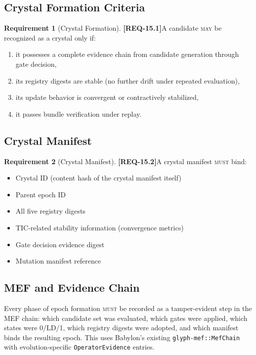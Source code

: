 \documentclass[11pt,a4paper,twoside]{article}
\theoremstyle{definition}
\newtheorem{requirement}{Requirement}[section]
\theoremstyle{remark}
\newcommand{\req}[1]{\textbf{\textcolor{reqred}{[REQ-#1]}}}
\newcommand{\must}{\textsc{must}}
\newcommand{\may}{\textsc{may}}
\begin{document}
\subsection{Crystal Formation Criteria}

\begin{requirement}[Crystal Formation]
\label{req:crystal-formation}
\req{15.1}\quad A candidate \may{} be recognized as a crystal only if:
\begin{enumerate}[label=(\roman*),nosep]
  \item it possesses a complete evidence chain from candidate generation through gate decision,
  \item its registry digests are stable (no further drift under repeated evaluation),
  \item its update behavior is convergent or contractively stabilized,
  \item it passes bundle verification under replay.
\end{enumerate}
\end{requirement}

\subsection{Crystal Manifest}

\begin{requirement}[Crystal Manifest]
\label{req:crystal-manifest}
\req{15.2}\quad A crystal manifest \must{} bind:
\begin{itemize}[nosep]
  \item Crystal ID (content hash of the crystal manifest itself)
  \item Parent epoch ID
  \item All five registry digests
  \item TIC-related stability information (convergence metrics)
  \item Gate decision evidence digest
  \item Mutation manifest reference
\end{itemize}
\end{requirement}

\subsection{MEF and Evidence Chain}

Every phase of epoch formation \must{} be recorded as a tamper-evident step in the MEF chain:
which candidate set was evaluated, which gates were applied, which states were 0/LD/1, which registry digests were adopted, and which manifest binds the resulting epoch. This uses Babylon's existing \texttt{glyph-mef::MefChain} with evolution-specific \texttt{OperatorEvidence} entries.
\end{document}
